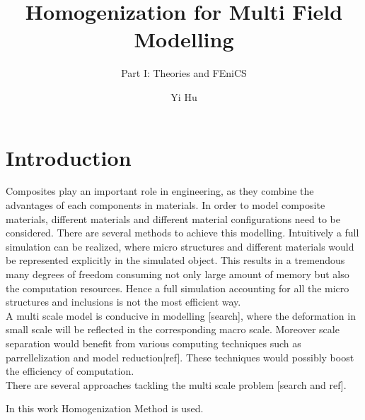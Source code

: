 \documentclass[10pt,a4paper]{scrreprt}
\author{Yi Hu}
\title{Homogenization for Multi Field Modelling}
\subtitle{Part I: Theories and FEniCS}
\begin{document}
\chapter{Introduction}

Composites play an important role in engineering, as they combine the advantages of each components in materials. In order to model composite materials, different materials and different material configurations need to be considered. There are several methods to achieve this modelling. Intuitively a full simulation can be realized, where micro structures and different materials would be represented explicitly in the simulated object. This results in a tremendous many degrees of freedom consuming not only large amount of memory but also the computation resources. Hence a full simulation accounting for all the micro structures and inclusions is not the most efficient way.\\

A multi scale model is conducive in modelling [search], where the deformation in small scale will be reflected in the corresponding macro scale. Moreover scale separation would benefit from various computing techniques such as parrellelization and model reduction[ref]. These techniques would possibly boost the efficiency of computation. \\

There are several approaches tackling the multi scale problem [search and ref].

In this work Homogenization Method is used.
\end{document}
